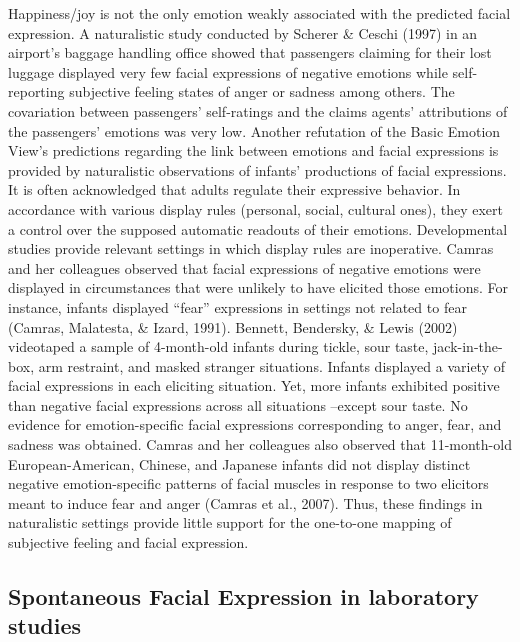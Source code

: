 \documentclass[
  english,
  doc]{apa7}
\begin{document}
Happiness/joy is not the only emotion weakly associated with the predicted facial expression. A naturalistic study conducted by Scherer \& Ceschi (1997) in an airport's baggage handling office showed that passengers claiming for their lost luggage displayed very few facial expressions of negative emotions while self-reporting subjective feeling states of anger or sadness among others. The covariation between passengers' self-ratings and the claims agents' attributions of the passengers' emotions was very low. Another refutation of the Basic Emotion View's predictions regarding the link between emotions and facial expressions is provided by naturalistic observations of infants' productions of facial expressions. It is often acknowledged that adults regulate their expressive behavior. In accordance with various display rules (personal, social, cultural ones), they exert a control over the supposed automatic readouts of their emotions. Developmental studies provide relevant settings in which display rules are inoperative. Camras and her colleagues observed that facial expressions of negative emotions were displayed in circumstances that were unlikely to have elicited those emotions. For instance, infants displayed ``fear'' expressions in settings not related to fear (Camras, Malatesta, \& Izard, 1991). Bennett, Bendersky, \& Lewis (2002) videotaped a sample of 4-month-old infants during tickle, sour taste, jack-in-the-box, arm restraint, and masked stranger situations. Infants displayed a variety of facial expressions in each eliciting situation. Yet, more infants exhibited positive than negative facial expressions across all situations --except sour taste. No evidence for emotion-specific facial expressions corresponding to anger, fear, and sadness was obtained. Camras and her colleagues also observed that 11-month-old European-American, Chinese, and Japanese infants did not display distinct negative emotion-specific patterns of facial muscles in response to two elicitors meant to induce fear and anger (Camras et al., 2007). Thus, these findings in naturalistic settings provide little support for the one-to-one mapping of subjective feeling and facial expression.

\hypertarget{spontaneous-facial-expression-in-laboratory-studies}{%
\subsection{Spontaneous Facial Expression in laboratory studies}\label{spontaneous-facial-expression-in-laboratory-studies}}
\end{document}
